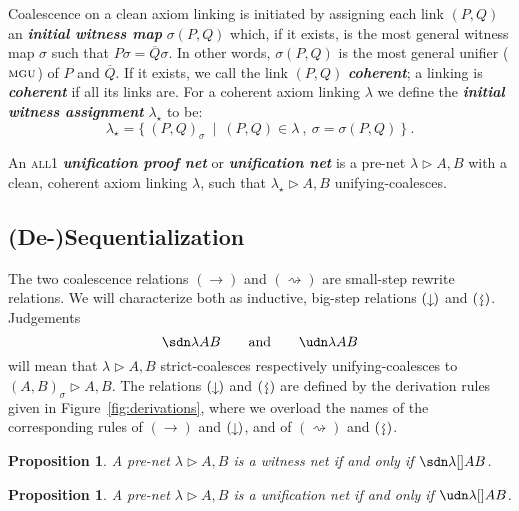 \documentclass[UKenglish]{lipics-v2016}
\theoremstyle{plain}
\newtheorem{proposition}[theorem]{Proposition}
\newcommand\defn[1]{\textit{\textbf{#1}}}
\newcommand\all{\textsc{all}}
\newcommand\+{+}
\renewcommand\*{\times}
\newcommand\dual[1]{\overline{#1}}
\newcommand\net[3]{#1\triangleright #2,#3}
\newcommand\link[3][\sigma]{(#2,#3)_{#1}}
\newcommand\scoal{\rightarrow} %
\newcommand\ucoal{\rightsquigarrow}
\newcommand\sdown{\mathrel{\rotatebox[origin=c]{-90}{$\scoal$}\kern1pt}}
\newcommand\udown{\mathrel{\rotatebox[origin=c]{-90}{$\ucoal$}\kern1pt}}
\begin{document}
Coalescence on a clean axiom linking is initiated by assigning each link $(P,Q)$ an \defn{initial witness map} $\sigma(P,Q)$ which, if it exists, is the most general witness map $\sigma$ such that $P\sigma=\dual Q\sigma$. In other words, $\sigma(P,Q)$ is the most general unifier ($\textsc{mgu}$) of $P$ and $\dual Q$. If it exists, we call the link $(P,Q)$ \defn{coherent}; a linking is \defn{coherent} if all its links are. For a coherent axiom linking $\lambda$ we define the \defn{initial witness assignment} $\lambda_\star$ to be:
\[
	\lambda_\star = \{~\link PQ~\mid~(P,Q)\in\lambda~,~\sigma=\sigma(P,Q)~\}~.
\]

\begin{definition}
An \all1 \defn{unification proof net} or \defn{unification net} is a pre-net $\net\lambda AB$ with a clean, coherent axiom linking $\lambda$, such that $\net{\lambda_\star}AB$ unifying-coalesces.
\end{definition}


\subsection{(De-)Sequentialization}

The two coalescence relations $(\scoal)$ and $(\ucoal)$ are small-step rewrite relations. We will characterize both as inductive, big-step relations $(\sdown)$ and $(\udown)$. Judgements 
\[
	\sdn\lambda AB
	\qquad\text{and}\qquad
	\udn\lambda AB
\]
will mean that $\net\lambda AB$ strict-coalesces respectively unifying-coalesces to $\net{\link AB}AB$. The relations $(\sdown)$ and $(\udown)$ are defined by the derivation rules given in Figure~\ref{fig:derivations}, where we overload the names of the corresponding rules of $(\scoal)$ and $(\sdown)$, and of $(\ucoal)$ and $(\udown)$.

\begin{proposition}
A pre-net $\net\lambda AB$ is a witness net if and only if $\sdn\lambda[]AB$.
\end{proposition}


%

\begin{proposition}
A pre-net $\net\lambda AB$ is a unification net if and only if $\udn\lambda[]AB$.
\end{proposition}
\end{document}
